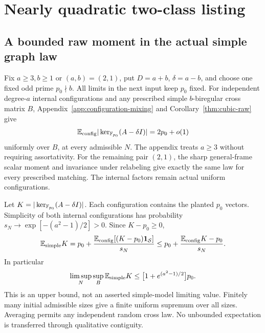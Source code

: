 \section{Nearly quadratic two-class listing}\label{sec:two-class-fast}
\subsection{A bounded raw moment in the actual simple graph law}
Fix $a\ge3,b\ge1$ or $(a,b)=(2,1)$, put $D=a+b$,
$\delta=a-b$, and choose one fixed odd prime
$p_0\nmid b$. All limits in the next input keep $p_0$ fixed.
For independent degree-$a$ internal configurations and any prescribed
simple $b$-biregular cross matrix $B$,
Appendix~\ref{app:configuration-mixing} and
Corollary~\ref{thm:cubic-raw} give
\begin{equation}\label{eq:raw-config-moment}
 \mathbb E_{\rm config}|\ker_{\mathbb F_{p_0}}(A-\delta I)|=2p_0+o(1)
\end{equation}
uniformly over $B$, at every admissible $N$.
The appendix treats $a\ge3$ without requiring assortativity. For the
remaining pair
$(2,1)$, the sharp general-frame scalar moment and invariance under
relabeling give exactly the same law for every prescribed matching.
The internal factors remain actual uniform configurations.

Let $K=|\ker_{\mathbb F_{p_0}}(A-\delta I)|$. Each configuration contains
the planted $p_0$ vectors. Simplicity of both internal configurations
has probability $s_N\to\exp[-(a^2-1)/2]>0$. Since $K-p_0\ge0$,
\begin{equation}\label{eq:raw-simple-transfer}
 \mathbb E_{\rm simple}K
 =p_0+\frac{\mathbb E_{\rm config}[(K-p_0)\mathbf 1_{\mathcal S}]}{s_N}
 \le p_0+\frac{\mathbb E_{\rm config}K-p_0}{s_N}.
\end{equation}
In particular
\begin{equation}\label{eq:raw-simple-moment}
 \limsup_N\sup_B\mathbb E_{\rm simple}K
 \le\bigl[1+e^{(a^2-1)/2}\bigr]p_0.
\end{equation}
This is an upper bound, not an asserted simple-model limiting value.
Finitely many initial admissible sizes give a finite uniform supremum
over all sizes. Averaging permits any independent random cross law.
No unbounded expectation is transferred through qualitative contiguity.

